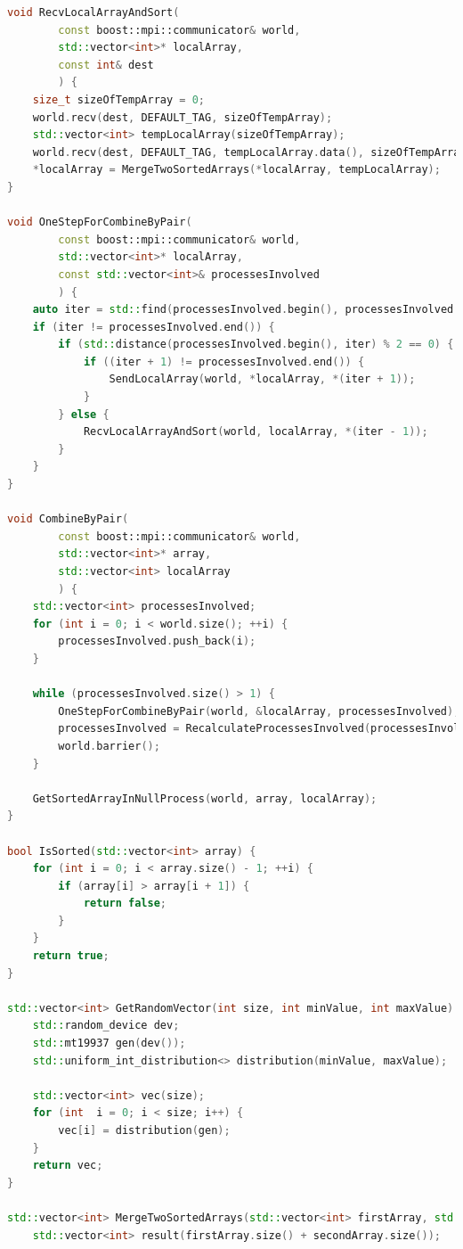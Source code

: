 \documentclass{report}
\begin{document}
\begin{lstlisting}[language=C++,caption=cpp файл]
void RecvLocalArrayAndSort(
        const boost::mpi::communicator& world,
        std::vector<int>* localArray,
        const int& dest
        ) {
    size_t sizeOfTempArray = 0;
    world.recv(dest, DEFAULT_TAG, sizeOfTempArray);
    std::vector<int> tempLocalArray(sizeOfTempArray);
    world.recv(dest, DEFAULT_TAG, tempLocalArray.data(), sizeOfTempArray);
    *localArray = MergeTwoSortedArrays(*localArray, tempLocalArray);
}

void OneStepForCombineByPair(
        const boost::mpi::communicator& world,
        std::vector<int>* localArray,
        const std::vector<int>& processesInvolved
        ) {
    auto iter = std::find(processesInvolved.begin(), processesInvolved.end(), world.rank());
    if (iter != processesInvolved.end()) {
        if (std::distance(processesInvolved.begin(), iter) % 2 == 0) {
            if ((iter + 1) != processesInvolved.end()) {
                SendLocalArray(world, *localArray, *(iter + 1));
            }
        } else {
            RecvLocalArrayAndSort(world, localArray, *(iter - 1));
        }
    }
}

void CombineByPair(
        const boost::mpi::communicator& world,
        std::vector<int>* array,
        std::vector<int> localArray
        ) {
    std::vector<int> processesInvolved;
    for (int i = 0; i < world.size(); ++i) {
        processesInvolved.push_back(i);
    }

    while (processesInvolved.size() > 1) {
        OneStepForCombineByPair(world, &localArray, processesInvolved);
        processesInvolved = RecalculateProcessesInvolved(processesInvolved);
        world.barrier();
    }

    GetSortedArrayInNullProcess(world, array, localArray);
}

bool IsSorted(std::vector<int> array) {
    for (int i = 0; i < array.size() - 1; ++i) {
        if (array[i] > array[i + 1]) {
            return false;
        }
    }
    return true;
}

std::vector<int> GetRandomVector(int size, int minValue, int maxValue) {
    std::random_device dev;
    std::mt19937 gen(dev());
    std::uniform_int_distribution<> distribution(minValue, maxValue);

    std::vector<int> vec(size);
    for (int  i = 0; i < size; i++) {
        vec[i] = distribution(gen);
    }
    return vec;
}

std::vector<int> MergeTwoSortedArrays(std::vector<int> firstArray, std::vector<int> secondArray) {
    std::vector<int> result(firstArray.size() + secondArray.size());


\end{lstlisting}
\end{document}
